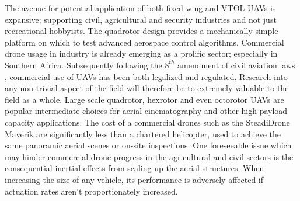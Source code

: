\par
The avenue for potential application of both fixed wing and VTOL UAVs is expansive; supporting civil\cite{civilquadcopter}, agricultural\cite{agriculturequadcopter} and security\cite{videosurveillancequadcopter} industries and not just recreational hobbyists. The quadrotor design provides a mechanically simple platform on which to test advanced aerospace control algorithms. Commercial drone usage in industry is already emerging as a prolific sector; especially in Southern Africa. Subsequently following the $8^{th}$ amendment of civil aviation laws \cite{dronelaw}, commercial use of UAVs has been both legalized and regulated. Research into any non-trivial aspect of the field will therefore be to extremely valuable to the field as a whole. Large scale quadrotor, hexrotor and even octorotor UAVs are popular intermediate choices for aerial cinematography and other high payload capacity applications. The cost of a commercial drones such as the SteadiDrone Maverik \cite{steadidrone} are significantly less than a chartered helicopter, used to achieve the same panoramic aerial scenes or on-site inspections. One foreseeable issue which may hinder commercial drone progress in the agricultural and civil sectors is the consequential inertial effects from scaling up the aerial structures. When increasing the size of any vehicle, its performance is adversely affected if actuation rates aren't proportionately increased.
